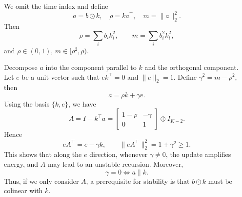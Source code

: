We omit the time index and define
\begin{equation}
a=b\odot k,\quad \rho = ka^\top,\quad m=\lVert a\rVert_2^2.
\end{equation}
Then
\begin{equation}
\rho=\sum_i b_i k_i^2,\qquad m=\sum_i b_i^2 k_i^2,
\end{equation}
and $\rho\in(0,1)$, $m\in[\rho^2,\rho)$.

Decompose $a$ into the component parallel to $k$ and the orthogonal component. Let $e$ be a unit vector such that $ek^\top = 0$ and $\lVert e\rVert_2=1$. Define $\gamma^2=m-\rho^2$, then
\begin{equation}
a = \rho k + \gamma e.
\end{equation}
Using the basis $\{k,e\}$, we have
\begin{equation}
A = I - k^\top a
= \begin{bmatrix}
1-\rho & -\gamma\\
0 & 1
\end{bmatrix}\oplus I_{K-2}.
\end{equation}
Hence
\begin{equation}
eA^\top = e - \gamma k,\qquad \lVert eA^\top\rVert_2^2 = 1+\gamma^2 \geq 1.
\end{equation}
This shows that along the $e$ direction, whenever $\gamma\neq 0$, the update amplifies energy, and $A$ may lead to an unstable recursion. Moreover,
\begin{equation}
\gamma=0 \iff a \parallel k.
\end{equation}
Thus, if we only consider $A$, a prerequisite for stability is that $b\odot k$ must be colinear with $k$.

